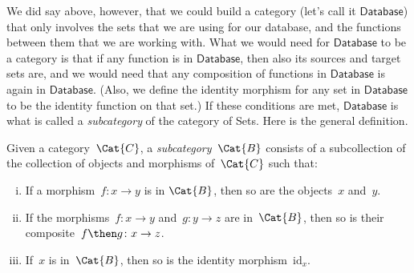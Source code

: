 We did say above, however, that we could build a category (let's call it $\mathsf{Database}$) that only involves the sets that we are using for our database, and the functions between them that we are working with. What we would need for $\mathsf{Database}$ to be a category is that if any function is in $\mathsf{Database}$, then also its sources and target sets are, and we would need that any composition of functions in $\mathsf{Database}$ is again in $\mathsf{Database}$. (Also, we define the identity morphism for any set in $\mathsf{Database}$ to be the identity function on that set.) If these conditions are met, $\mathsf{Database}$ is what is called a \emph{subcategory} of the category of Sets. Here is the general definition. 

\begin{shaded}
\begin{definition}[Subcategory]
\label{def:subcategory}
	Given a category~$\Cat{C}$, a \emph{subcategory}~$\Cat{B}$ consists of a subcollection of the collection of objects and morphisms of~$\Cat{C}$ such that:
	\begin{enumerate}[(i)]
	\item If a morphism~$f \colon x\to y$ is in $\Cat{B}$, then so are the objects~$x$ and~$y$.
	\item If the morphisms~$f\colon x\to y$ and~$g\colon y\to z$ are in~$\Cat{B}$, then so is their composite~$f\then g\colon x\to z$.
	\item If~$x$ is in~$\Cat{B}$, then so is the identity morphism~$\text{id}_x$.
	\end{enumerate}
\end{definition}
\end{shaded}


